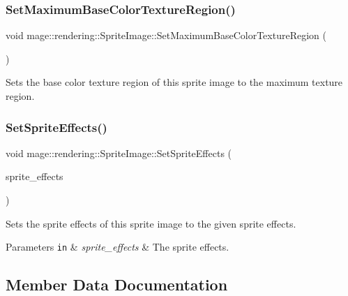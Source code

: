 \subsubsection{\texorpdfstring{Set\+Maximum\+Base\+Color\+Texture\+Region()}{SetMaximumBaseColorTextureRegion()}}
{\footnotesize\ttfamily void mage\+::rendering\+::\+Sprite\+Image\+::\+Set\+Maximum\+Base\+Color\+Texture\+Region (\begin{DoxyParamCaption}{ }\end{DoxyParamCaption})\hspace{0.3cm}{\ttfamily [noexcept]}}

Sets the base color texture region of this sprite image to the maximum texture region. \hypertarget{classmage_1_1rendering_1_1_sprite_image_a504ebb2cdc216d26bdbcb24cfa5466d4}{}\label{classmage_1_1rendering_1_1_sprite_image_a504ebb2cdc216d26bdbcb24cfa5466d4} 
\subsubsection{\texorpdfstring{Set\+Sprite\+Effects()}{SetSpriteEffects()}}
{\footnotesize\ttfamily void mage\+::rendering\+::\+Sprite\+Image\+::\+Set\+Sprite\+Effects (\begin{DoxyParamCaption}\item[{\hyperlink{namespacemage_1_1rendering_a4dbc3536c87b906f1d41d863ec458e78}{Sprite\+Effect}}]{sprite\+\_\+effects }\end{DoxyParamCaption})\hspace{0.3cm}{\ttfamily [noexcept]}}

Sets the sprite effects of this sprite image to the given sprite effects.


\begin{DoxyParams}[1]{Parameters}
\mbox{\tt in}  & {\em sprite\+\_\+effects} & The sprite effects. \\
\hline
\end{DoxyParams}


\subsection{Member Data Documentation}
\hypertarget{classmage_1_1rendering_1_1_sprite_image_a1d7c771b5d2a6665260b528dd426ff43}{}\label{classmage_1_1rendering_1_1_sprite_image_a1d7c771b5d2a6665260b528dd426ff43} 
